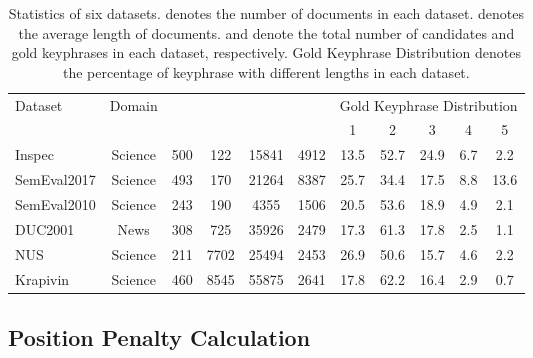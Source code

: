 \documentclass[11pt]{article}
\begin{document}
\begin{table*}
\centering
{}
\begin{tabular}{lcccccccccc} 
\toprule
\multirow{2}{*}{Dataset} & \multirow{2}{*}{Domain} & \multirow{2}{*}{} & \multirow{2}{*}{} & \multirow{2}{*}{} & \multirow{2}{*}{} & \multicolumn{5}{c}{Gold Keyphrase Distribution}  \\ 
\cmidrule{7-11}
                         &                    &                    &                         &                    &                    & 1    & 2    & 3    & 4   & 5                     \\ 
\midrule
Inspec                   & Science            & 500                & 122                     & 15841              & 4912               & 13.5 & 52.7 & 24.9 & 6.7 & 2.2                   \\
SemEval2017              & Science            & 493                & 170                     & 21264              & 8387               & 25.7 & 34.4 & 17.5 & 8.8 & 13.6                  \\
SemEval2010              & Science            & 243                & 190                     & 4355               & 1506               & 20.5 & 53.6 & 18.9 & 4.9 & 2.1                   \\
DUC2001                  & News               & 308                & 725                     & 35926              & 2479               & 17.3 & 61.3 & 17.8 & 2.5 & 1.1                   \\
NUS                      & Science            & 211                & 7702                    & 25494              & 2453               & 26.9 & 50.6 & 15.7 & 4.6 & 2.2                   \\
Krapivin                 & Science            & 460                & 8545                    & 55875              & 2641               & 17.8 & 62.2 & 16.4 & 2.9 & 0.7                   \\
\bottomrule
\end{tabular}
\caption{Statistics of six datasets.  denotes the number of documents in each dataset.  denotes the average length of documents.  and  denote the total number of candidates and gold keyphrases in each dataset, respectively. Gold Keyphrase Distribution denotes the percentage of keyphrase with different lengths in each dataset.} 
\label{tb: dataset}
\end{table*}



\subsection{Position Penalty Calculation}
\label{sec: pos}
\end{document}
